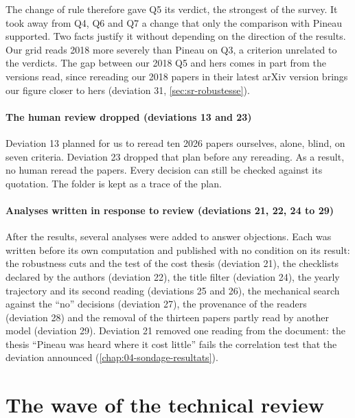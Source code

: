 The change of rule therefore gave Q5 its verdict, the strongest of the survey. It took away from Q4,
Q6 and Q7 a change that only the comparison with Pineau supported. Two facts justify it without
depending on the direction of the results. Our grid reads 2018 more severely than Pineau on Q3, a
criterion unrelated to the verdicts. The gap between our 2018 Q5 and hers comes in part from the
versions read, since rereading our 2018 papers in their latest arXiv version brings our figure
closer to hers (deviation 31, \cref{sec:sr-robustesse}).

\paragraph{The human review dropped (deviations 13 and 23)} Deviation 13 planned for us
to reread ten 2026 papers ourselves, alone, blind, on seven criteria. Deviation 23 dropped that plan
before any rereading. As a result, no human reread the papers. Every decision can
still be checked against its quotation. The folder  is kept as a
trace of the plan.

\paragraph{Analyses written in response to review (deviations 21, 22, 24 to 29)} After the results,
several analyses were added to answer objections. Each was written before its own computation and
published with no condition on its result: the robustness cuts and the test of the cost thesis (deviation 21), the
checklists declared by the authors (deviation 22), the title filter (deviation 24), the yearly
trajectory and its second reading (deviations 25 and 26), the mechanical search against the
\enquote{no} decisions (deviation 27), the provenance of the readers (deviation 28) and the removal of
the thirteen papers partly read by another model (deviation 29). Deviation 21 removed one reading
from the document: the thesis \enquote{Pineau was heard where it cost little} fails the correlation
test that the deviation announced (\cref{chap:04-sondage-resultats}).

\section{The wave of the technical review}
\label{sec:ecarts-audit}

